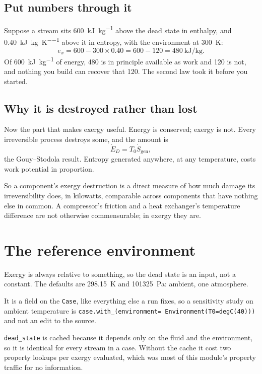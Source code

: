 \documentclass[11pt,a4paper]{report}
\newcommand{\code}[1]{\texttt{\small #1}}
\begin{document}
\subsection{Put numbers through it}

Suppose a stream sits \SI{600}{\kilo\joule\per\kilogram} above the dead
state in enthalpy, and \SI{0.40}{\kilo\joule\per\kilogram\per\kelvin} above
it in entropy, with the environment at \SI{300}{\kelvin}:
\[
  e_x = 600 - 300 \times 0.40 = 600 - 120
      = \SI{480}{\kilo\joule\per\kilogram}.
\]
Of \SI{600}{\kilo\joule\per\kilogram} of energy, \SI{480}{} is in principle
available as work and \SI{120}{} is not, and nothing you build can recover
that \SI{120}{}. The second law took it before you started.

\subsection{Why it is destroyed rather than lost}

Now the part that makes exergy useful. Energy is conserved; exergy is not.
Every irreversible process destroys some, and the amount is
\[
  \dot E_D = T_0 \dot S_{\text{gen}},
\]
the Gouy--Stodola result. Entropy generated anywhere, at any temperature,
costs work potential in proportion.

So a component's exergy destruction is a direct measure of how much damage
its irreversibility does, in kilowatts, comparable across components that
have nothing else in common. A compressor's friction and a heat exchanger's
temperature difference are not otherwise commensurable; in exergy they are.

\section{The reference environment}

Exergy is always relative to something, so the dead state is an input, not
a constant. The defaults are \SI{298.15}{\kelvin} and
\SI{101325}{\pascal}: ambient, one atmosphere.


\begin{choicebox}
It is a field on the \code{Case}, like everything else a run fixes, so a
sensitivity study on ambient temperature is \code{case.with\_(environment=
Environment(T0=degC(40)))} and not an edit to the source.

\code{dead\_state} is cached because it depends only on the fluid and the
environment, so it is identical for every stream in a case. Without the
cache it cost two property lookups per exergy evaluated, which was most of
this module's property traffic for no information.
\end{choicebox}
\end{document}
